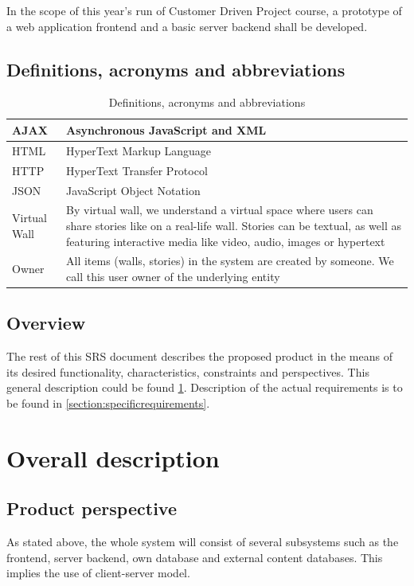 \documentclass[11pt]{book}
\begin{document}
In the scope of this year’s run of Customer Driven Project course, a prototype of a web application frontend and a basic server backend shall be developed.

\subsection{Definitions, acronyms and abbreviations}

\begin{table}[H]
\centering
\begin{tabular}{ l  p{11cm} }
AJAX & Asynchronous JavaScript and XML\\
\hline
HTML & HyperText Markup Language\\
\hline
HTTP & HyperText Transfer Protocol\\
\hline
JSON & JavaScript Object Notation\\
\hline
Virtual Wall & By virtual wall, we understand a virtual space where users can share stories like on a real-life wall. Stories can be textual, as well as featuring interactive media like video, audio, images or hypertext\\
\hline
Owner & All items (walls, stories) in the system are created by someone. We call this user owner of the underlying entity\\

\end{tabular}
\label{tab:requirements_definitions}
\caption{Definitions, acronyms and abbreviations}
\end{table}

\subsection{Overview}
The rest of this SRS document describes the proposed product in the means of its desired functionality, characteristics, constraints and perspectives. This general description could be found \ref{section:overalldescription}. Description of the actual requirements is to be found in \ref{section:specificrequirements}.

\section{Overall description}\label{section:overalldescription}
\subsection{Product perspective}
As stated above, the whole system will consist of several subsystems such as the frontend, server backend, own database and external content databases. This implies the use of client-server model.
\end{document}
